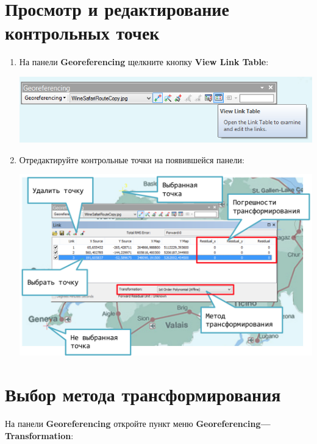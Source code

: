 \documentclass[12pt,]{book}
\begin{document}
\hypertarget{section-44}{%
\section{Просмотр и редактирование контрольных точек}\label{section-44}}

\begin{enumerate}
\def\labelenumi{\arabic{enumi}.}
\item
  На панели \textbf{Georeferencing} щелкните кнопку \textbf{View Link Table}:

  \includegraphics{images/Appendix/image84.png}
\item
  Отредактируйте контрольные точки на появившейся панели:

  \includegraphics{images/Appendix/image85.png}
\end{enumerate}

\hypertarget{section-45}{%
\section{Выбор метода трансформирования}\label{section-45}}

На панели \textbf{Georeferencing} откройте пункт меню \textbf{Georeferencing---Transformation}:
\end{document}
